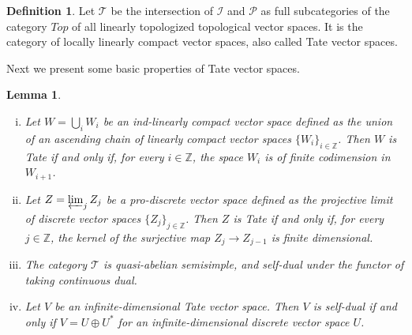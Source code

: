 \documentclass[12pt,reqno]{amsart}
\newtheorem{lem}[thm]{Lemma}
\theoremstyle{definition}
\newtheorem{defn}[thm]{Definition}
\theoremstyle{remark}
\begin{document}
    \begin{defn}
        Let $\mathcal{T}$ be the intersection of $\mathcal{I}$ and $\mathcal{P}$ as full subcategories of the category $Top$ of all linearly topologized topological vector spaces. It is the category of locally linearly compact vector spaces, also called Tate vector spaces.
    \end{defn}
 
	Next we present some basic properties of Tate vector spaces.
	\begin{lem}\label{lem:prelim}
	\begin{enumerate}[(i)]
	    \item 
	    Let $W = \bigcup_i W_i$ be an ind-linearly compact vector space defined as the union of an ascending chain of linearly compact vector spaces $\{W_i\}_{i \in \mathbb{Z}}$. Then $W$ is Tate if and only if, for every $i\in \mathbb{Z}$, the space $W_i$ is of finite codimension in $W_{i+1}$.
	    
	    \item 
	    Let $Z = \varprojlim_j Z_j$ be a pro-discrete vector space defined as the projective limit of discrete vector spaces $\{Z_j\}_{j \in \mathbb{Z}}$. Then $Z$ is Tate if and only if, for every $j\in \mathbb{Z}$, the kernel of the surjective map $Z_j \rightarrow Z_{j-1}$ is finite dimensional.
	    
	    \item 
	    The category $\mathcal{T}$ is quasi-abelian semisimple, and self-dual under the functor of taking continuous dual.
	    
	    \item \label{self-dual}
	    Let $V$ be an infinite-dimensional Tate vector space. Then $V$ is self-dual if and only if $V = U\oplus U^\ast$ for an infinite-dimensional discrete vector space $U$.
	\end{enumerate}
	\end{lem}
	
\end{document}
